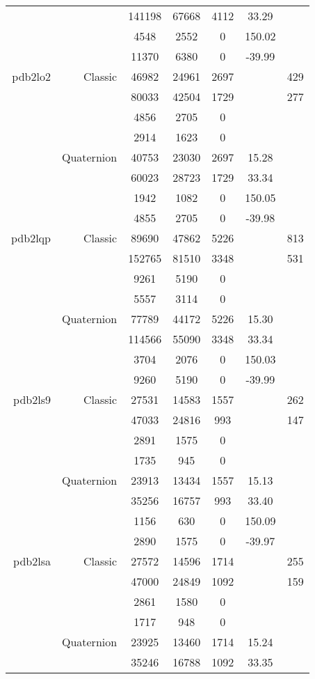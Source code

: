 \begin{xltabular}{\textwidth}{r|rcccSc}
& & 141198 & 67668 & 4112 & 33.29 & \\
& & 4548 & 2552 & 0 & 150.02 & \\
& & 11370 & 6380 & 0 & -39.99 & \\ \addlinespace
pdb2lo2 & Classic & 46982 & 24961 & 2697 & & 429 \\
& & 80033 & 42504 & 1729 & & 277 \\
& & 4856 & 2705 & 0 & & \\
& & 2914 & 1623 & 0 & & \\
& Quaternion & 40753 & 23030 & 2697 & 15.28 & \\
& & 60023 & 28723 & 1729 & 33.34 & \\
& & 1942 & 1082 & 0 & 150.05 & \\
& & 4855 & 2705 & 0 & -39.98 & \\ \addlinespace
pdb2lqp & Classic & 89690 & 47862 & 5226 & & 813 \\
& & 152765 & 81510 & 3348 & & 531 \\
& & 9261 & 5190 & 0 & & \\
& & 5557 & 3114 & 0 & & \\
& Quaternion & 77789 & 44172 & 5226 & 15.30 & \\
& & 114566 & 55090 & 3348 & 33.34 & \\
& & 3704 & 2076 & 0 & 150.03 & \\
& & 9260 & 5190 & 0 & -39.99 & \\ \addlinespace
pdb2ls9 & Classic & 27531 & 14583 & 1557 & & 262 \\
& & 47033 & 24816 & 993 & & 147 \\
& & 2891 & 1575 & 0 & & \\
& & 1735 & 945 & 0 & & \\
& Quaternion & 23913 & 13434 & 1557 & 15.13 & \\
& & 35256 & 16757 & 993 & 33.40 & \\
& & 1156 & 630 & 0 & 150.09 & \\
& & 2890 & 1575 & 0 & -39.97 & \\ \addlinespace
pdb2lsa & Classic & 27572 & 14596 & 1714 & & 255 \\
& & 47000 & 24849 & 1092 & & 159 \\
& & 2861 & 1580 & 0 & & \\
& & 1717 & 948 & 0 & & \\
& Quaternion & 23925 & 13460 & 1714 & 15.24 & \\
& & 35246 & 16788 & 1092 & 33.35 & \\

\end{xltabular}
